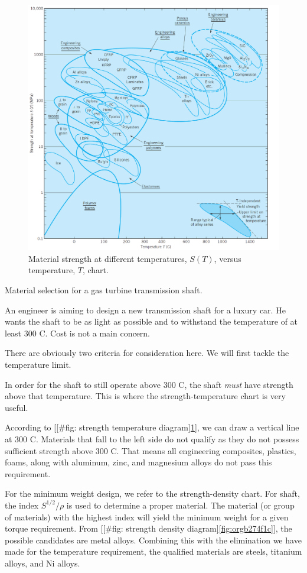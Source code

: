 \documentclass[a4paper,openany,12pt]{book}
\begin{document}
\begin{enumerate}
\begin{figure}[htbp]
\centering
\includegraphics[width=.9\linewidth]{pictures/Material-selection/strength-temperature-diagram.pdf}
\caption{\label{fig:org9265836}
Material strength at different temperatures, \(S(T)\), versus temperature, \(T\), chart. \cite{ashby2010materials}}
\end{figure}

Material selection for a gas turbine transmission shaft.

An engineer is aiming to design a new transmission shaft for a luxury
car. He wants the shaft to be as light as possible and to withstand the
temperature of at least 300 C. Cost is not a main concern.

There are obviously two criteria for consideration here. We will first
tackle the temperature limit.

In order for the shaft to still operate above 300 C, the shaft \emph{must}
have strength above that temperature. This is where the
strength-temperature chart is very useful.

According to
[[\#fig: strength temperature diagram]\ref{fig:org9265836}],
we can draw a vertical line at 300 C. Materials that fall to the left
side do not qualify as they do not possess sufficient strength above 300
C. That means all engineering composites, plastics, foams, along with
aluminum, zinc, and magnesium alloys do not pass this requirement.

For the minimum weight design, we refer to the strength-density chart.
For shaft, the index \(S^{1/2}/\rho\) is used to determine a proper
material. The material (or group of materials) with the highest index
will yield the minimum weight for a given torque requirement. From
[[\#fig: strength density diagram]\ref{fig:orgb274f1c}], the
possible candidates are metal alloys. Combining this with the
elimination we have made for the temperature requirement, the qualified
materials are steels, titanium alloys, and Ni alloys.
\end{enumerate}
\end{document}
